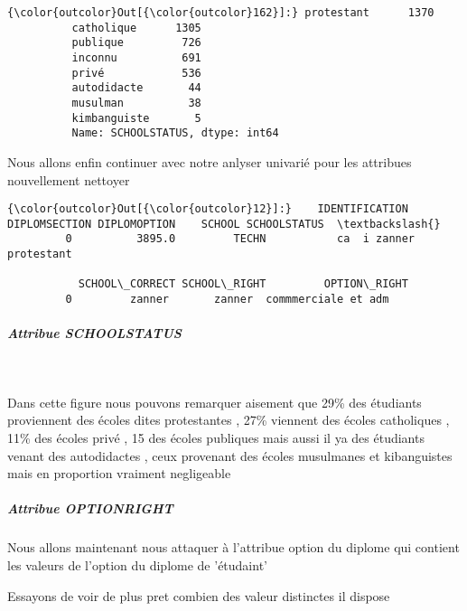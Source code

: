\documentclass[11pt]{article}
\begin{document}
            \begin{Verbatim}[commandchars=\\\{\}]
{\color{outcolor}Out[{\color{outcolor}162}]:} protestant      1370
          catholique      1305
          publique         726
          inconnu          691
          privé            536
          autodidacte       44
          musulman          38
          kimbanguiste       5
          Name: SCHOOLSTATUS, dtype: int64
\end{Verbatim}
        
    Nous allons enfin continuer avec notre anlyser univarié pour les
attribues nouvellement nettoyer

            \begin{Verbatim}[commandchars=\\\{\}]
{\color{outcolor}Out[{\color{outcolor}12}]:}    IDENTIFICATION DIPLOMSECTION DIPLOMOPTION    SCHOOL SCHOOLSTATUS  \textbackslash{}
         0          3895.0         TECHN           ca  i zanner   protestant   
         
           SCHOOL\_CORRECT SCHOOL\_RIGHT         OPTION\_RIGHT  
         0         zanner       zanner  commmerciale et adm  
\end{Verbatim}
        
    \subparagraph{Attribue SCHOOLSTATUS}\label{attribue-schoolstatus}

    \begin{center}
    \end{center}
    { \hspace*{\fill} \\}
    
    Dans cette figure nous pouvons remarquer aisement que 29\% des étudiants
proviennent des écoles dites protestantes , 27\% viennent des écoles
catholiques , 11\% des écoles privé , 15 des écoles publiques mais aussi
il ya des étudiants venant des autodidactes , ceux provenant des écoles
musulmanes et kibanguistes mais en proportion vraiment negligeable

    \subparagraph{Attribue OPTIONRIGHT}\label{attribue-optionright}

    Nous allons maintenant nous attaquer à l'attribue option du diplome qui
contient les valeurs de l'option du diplome de 'étudaint'

    Essayons de voir de plus pret combien des valeur distinctes il dispose
\end{document}
